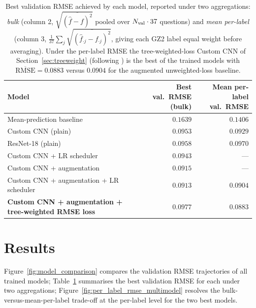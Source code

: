 \documentclass[10pt,preprint2]{aastex}
\begin{document}
\begin{table}[t!]
  \centering
  \begin{tabular}{lrr}
    \toprule
    Model & \shortstack{Best val.\ RMSE\\(bulk)} & \shortstack{Mean per-label\\val.\ RMSE} \\
    \midrule
    Mean-prediction baseline                           & $0.1639$ & $0.1406$ \\
    Custom CNN (plain)                                  & $0.0953$ & $0.0929$ \\
    ResNet-18 (plain)                                   & $0.0958$ & $0.0970$ \\
    Custom CNN + LR scheduler                           & $0.0943$ & ---      \\
    Custom CNN + augmentation                           & $0.0915$ & ---      \\
    Custom CNN + augmentation + LR scheduler            & $0.0913$ & $0.0904$ \\
    \shortstack[l]{\textbf{Custom CNN + augmentation +}\\\textbf{tree-weighted RMSE loss}} & $0.0977$ & $\mathbf{0.0883}$ \\
    \bottomrule
  \end{tabular}
  \caption{Best validation RMSE achieved by each model, reported under two aggregations: \emph{bulk} (column 2, $\sqrt{\overline{(\hat f-f)^2}}$ pooled over $N_{\rm val}\cdot 37$ questions) and \emph{mean per-label} (column 3, $\frac{1}{37}\sum_j \sqrt{\overline{(\hat f_{\cdot j}-f_{\cdot j})^2}}$, giving each GZ2 label equal weight before averaging). Under the per-label RMSE the tree-weighted-loss Custom CNN of Section~\ref{sec:treeweight} (following \citealt{Dieleman2015}) is the best of the trained models with $\overline{\mathrm{RMSE}} = 0.0883$ versus $0.0904$ for the augmented unweighted-loss baseline.}
  \label{tab:model_rmse}
\end{table}

\section{Results}
\label{sec:eval}

Figure~\ref{fig:model_comparison} compares the validation RMSE trajectories of all trained models; Table~\ref{tab:model_rmse} summarises the best validation RMSE for each under two aggregations; Figure~\ref{fig:per_label_rmse_multimodel} resolves the bulk-versus-mean-per-label trade-off at the per-label level for the two best models.
\end{document}

